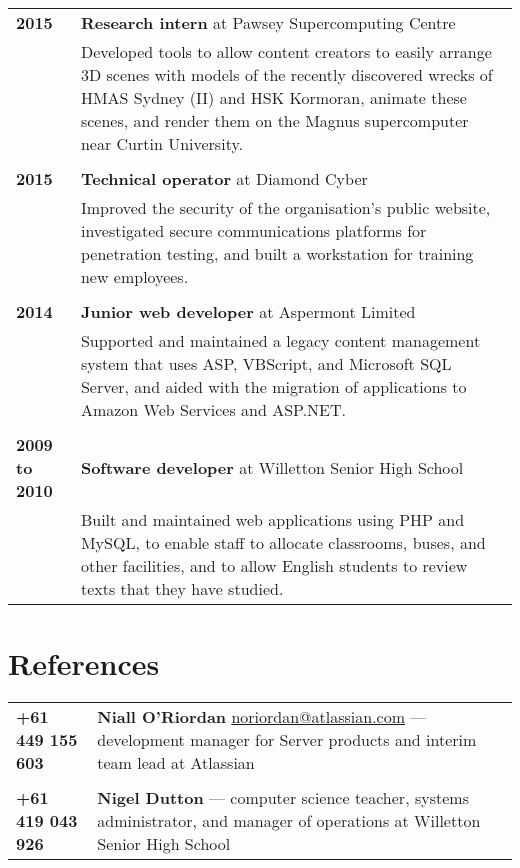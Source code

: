 \documentclass[a4paper,12pt]{article}
\begin{document}
\begin{tabular}{p{35mm}p{125mm}}
	                    \textbf{2015}               & \textbf{Research intern} at Pawsey Supercomputing Centre
	\vspace{0.2em}  \\                              & Developed tools to allow content creators to easily arrange 3D scenes with models of the recently discovered wrecks of HMAS Sydney (II) and HSK Kormoran, animate these scenes, and render them on the Magnus supercomputer near Curtin University.
	\\              \\  \textbf{2015}               & \textbf{Technical operator} at Diamond Cyber
	\vspace{0.2em}  \\                              & Improved the security of the organisation's public website, investigated secure communications platforms for penetration testing, and built a workstation for training new employees.
	\\              \\  \textbf{2014}               & \textbf{Junior web developer} at Aspermont Limited
	\vspace{0.2em}  \\                              & Supported and maintained a legacy content management system that uses ASP, VBScript, and Microsoft SQL Server, and aided with the migration of applications to Amazon Web Services and ASP.NET.
	\\              \\  \textbf{2009 to 2010}       & \textbf{Software developer} at Willetton Senior High School
	\vspace{0.2em}  \\                              & Built and maintained web applications using PHP and MySQL, to enable staff to allocate classrooms, buses, and other facilities, and to allow English students to review texts that they have studied.
\end{tabular}

\section*{References}

\begin{tabular}{p{35mm}p{125mm}}
	                    \textbf{+61 449 155 603}    & \textbf{Niall O’Riordan} \textlangle{}\href{mailto:noriordan@atlassian.com}{noriordan@atlassian.com}\textrangle{} --- development manager for Server products and interim team lead at Atlassian
	\\              \\  \textbf{+61 419 043 926}    & \textbf{Nigel Dutton} --- computer science teacher, systems administrator, and manager of operations at Willetton Senior High School
\end{tabular}
\end{document}
